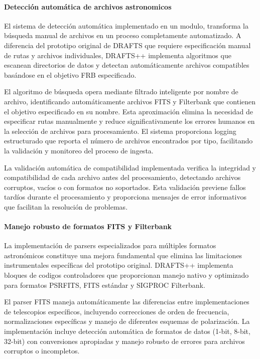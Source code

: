 \paragraph{Detección automática de archivos astronomicos}

El sistema de detección automática implementado en un modulo, transforma la búsqueda manual de archivos en un proceso completamente automatizado. A diferencia del prototipo original de DRAFTS que requiere especificación manual de rutas y archivos individuales, DRAFTS++ implementa algoritmos que escanean directorios de datos y detectan automáticamente archivos compatibles basándose en el objetivo FRB especificado.

El algoritmo de búsqueda opera mediante filtrado inteligente por nombre de archivo, identificando automáticamente archivos FITS y Filterbank que contienen el objetivo especificado en su nombre. Esta aproximación elimina la necesidad de especificar rutas manualmente y reduce significativamente los errores humanos en la selección de archivos para procesamiento. El sistema proporciona logging estructurado que reporta el número de archivos encontrados por tipo, facilitando la validación y monitoreo del proceso de ingesta.

La validación automática de compatibilidad implementada verifica la integridad y compatibilidad de cada archivo antes del procesamiento, detectando archivos corruptos, vacíos o con formatos no soportados. Esta validación previene fallos tardíos durante el procesamiento y proporciona mensajes de error informativos que facilitan la resolución de problemas.

\paragraph{Manejo robusto de formatos FITS y Filterbank}

La implementación de parsers especializados para múltiples formatos astronómicos constituye una mejora fundamental que elimina las limitaciones instrumentales específicas del prototipo original. DRAFTS++ implementa bloques de codigos controladores que proporcionan manejo nativo y optimizado para formatos PSRFITS, FITS estándar y SIGPROC Filterbank.

El parser FITS maneja automáticamente las diferencias entre implementaciones de telescopios específicos, incluyendo correcciones de orden de frecuencia, normalizaciones específicas y manejo de diferentes esquemas de polarización. La implementación incluye detección automática de formatos de datos (1-bit, 8-bit, 32-bit) con conversiones apropiadas y manejo robusto de errores para archivos corruptos o incompletos.

